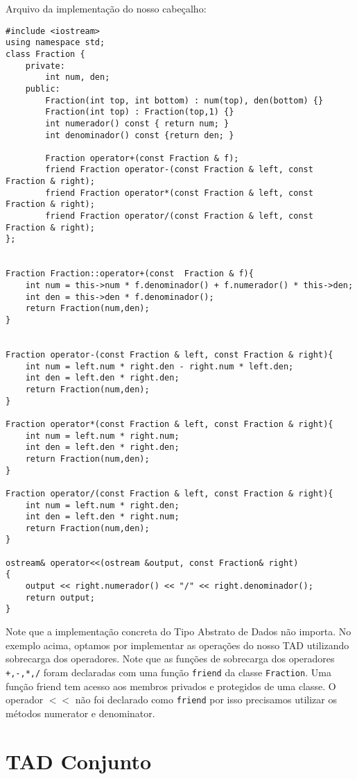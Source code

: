 Arquivo da implementação do nosso cabeçalho:

\begin{verbatim}
#include <iostream>
using namespace std;
class Fraction {
	private:
		int num, den;
	public:
		Fraction(int top, int bottom) : num(top), den(bottom) {}
		Fraction(int top) : Fraction(top,1) {}
		int numerador() const { return num; }
		int denominador() const {return den; }

        Fraction operator+(const Fraction & f);
		friend Fraction operator-(const Fraction & left, const Fraction & right);
		friend Fraction operator*(const Fraction & left, const Fraction & right);
		friend Fraction operator/(const Fraction & left, const Fraction & right);
};


Fraction Fraction::operator+(const  Fraction & f){
    int num = this->num * f.denominador() + f.numerador() * this->den;
	int den = this->den * f.denominador();
	return Fraction(num,den);
}


Fraction operator-(const Fraction & left, const Fraction & right){
	int num = left.num * right.den - right.num * left.den;
	int den = left.den * right.den;
	return Fraction(num,den);
}

Fraction operator*(const Fraction & left, const Fraction & right){
	int num = left.num * right.num;
	int den = left.den * right.den;
	return Fraction(num,den);
}

Fraction operator/(const Fraction & left, const Fraction & right){
	int num = left.num * right.den;
	int den = left.den * right.num;
	return Fraction(num,den);
}

ostream& operator<<(ostream &output, const Fraction& right)
{
    output << right.numerador() << "/" << right.denominador();
    return output;
}

\end{verbatim}

Note que a implementação concreta do Tipo Abstrato de Dados não importa. No exemplo acima, optamos por implementar as operações do nosso TAD utilizando sobrecarga dos operadores. Note que as funções de sobrecarga dos operadores \texttt{+,-,*,/} foram declaradas com uma função \texttt{friend} da classe \texttt{Fraction}. Uma função friend tem acesso aos membros privados e protegidos de uma classe. O operador $<<$ não foi declarado como \texttt{friend} por isso precisamos utilizar os métodos numerator e denominator. 


\section{TAD Conjunto}

